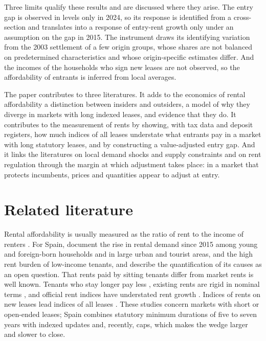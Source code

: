 \documentclass[11pt,a4paper]{article}
\begin{document}
Three limits qualify these results and are discussed where they arise. The entry gap is observed in levels only in 2024, so its response is identified from a cross-section and translates into a response of entry-rent growth only under an assumption on the gap in 2015. The instrument draws its identifying variation from the 2003 settlement of a few origin groups, whose shares are not balanced on predetermined characteristics and whose origin-specific estimates differ. And the incomes of the households who sign new leases are not observed, so the affordability of entrants is inferred from local averages.

The paper contributes to three literatures. It adds to the economics of rental affordability \citep{quigley2004,khametshin2024} a distinction between insiders and outsiders, a model of why they diverge in markets with long indexed leases, and evidence that they do. It contributes to the measurement of rents by showing, with tax data and deposit registers, how much indices of all leases \citep{genesove2003,ambrose2015,crone2010,adams2024} understate what entrants pay in a market with long statutory leases, and by constructing a value-adjusted entry gap. And it links the literatures on local demand shocks and supply constraints \citep{saiz2010,glaeser2018,hilber2016} and on rent regulation \citep{arnott1995,autor2014,diamond2019,jofre2023} through the margin at which adjustment takes place: in a market that protects incumbents, prices and quantities appear to adjust at entry.

\section{Related literature}\label{sec:lit}

Rental affordability is usually measured as the ratio of rent to the income of renters \citep{quigley2004}. For Spain, \citet{khametshin2024} document the rise in rental demand since 2015 among young and foreign-born households and in large urban and tourist areas, and the high rent burden of low-income tenants, and describe the quantification of its causes as an open question. That rents paid by sitting tenants differ from market rents is well known. Tenants who stay longer pay less \citep{goodman1985,ambrose2015}, existing rents are rigid in nominal terms \citep{genesove2003}, and official rent indices have understated rent growth \citep{crone2010}. Indices of rents on new leases lead indices of all leases \citep{adams2024}. These studies concern markets with short or open-ended leases; Spain combines statutory minimum durations of five to seven years with indexed updates and, recently, caps, which makes the wedge larger and slower to close.
\end{document}
